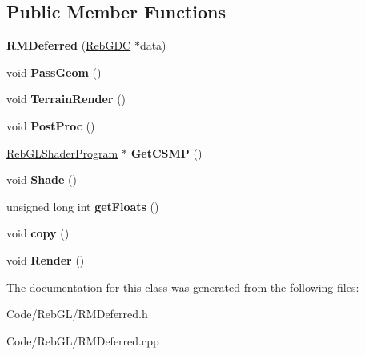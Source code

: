 \subsection*{Public Member Functions}
\begin{DoxyCompactItemize}
\item 
{\bfseries R\+M\+Deferred} (\hyperlink{class_reb_g_d_c}{Reb\+G\+DC} $\ast$data)\hypertarget{class_r_m_deferred_abbf4b490e09042baec769e5b99e96def}{}\label{class_r_m_deferred_abbf4b490e09042baec769e5b99e96def}

\item 
void {\bfseries Pass\+Geom} ()\hypertarget{class_r_m_deferred_a4f677db282954e6221e80b9ff1812abf}{}\label{class_r_m_deferred_a4f677db282954e6221e80b9ff1812abf}

\item 
void {\bfseries Terrain\+Render} ()\hypertarget{class_r_m_deferred_a5a8791bd4821bac19715ec33526816fe}{}\label{class_r_m_deferred_a5a8791bd4821bac19715ec33526816fe}

\item 
void {\bfseries Post\+Proc} ()\hypertarget{class_r_m_deferred_ab242cc10b809d49086f3c84e9cd139ac}{}\label{class_r_m_deferred_ab242cc10b809d49086f3c84e9cd139ac}

\item 
\hyperlink{class_reb_g_l_shader_program}{Reb\+G\+L\+Shader\+Program} $\ast$ {\bfseries Get\+C\+S\+MP} ()\hypertarget{class_r_m_deferred_aa7b56760a9843a52e00d8863d0989f1c}{}\label{class_r_m_deferred_aa7b56760a9843a52e00d8863d0989f1c}

\item 
void {\bfseries Shade} ()\hypertarget{class_r_m_deferred_a3132605e260a61ce0a4baccb10c91704}{}\label{class_r_m_deferred_a3132605e260a61ce0a4baccb10c91704}

\item 
unsigned long int {\bfseries get\+Floats} ()\hypertarget{class_r_m_deferred_a6c7352c848f3f01e9ad88b057ba61342}{}\label{class_r_m_deferred_a6c7352c848f3f01e9ad88b057ba61342}

\item 
void {\bfseries copy} ()\hypertarget{class_r_m_deferred_abac9b80b6bc66dcc2f20ffd5ab32a859}{}\label{class_r_m_deferred_abac9b80b6bc66dcc2f20ffd5ab32a859}

\item 
void {\bfseries Render} ()\hypertarget{class_r_m_deferred_a0b34285239a7ba44d668ef42a6170144}{}\label{class_r_m_deferred_a0b34285239a7ba44d668ef42a6170144}

\end{DoxyCompactItemize}


The documentation for this class was generated from the following files\+:\begin{DoxyCompactItemize}
\item 
Code/\+Reb\+G\+L/R\+M\+Deferred.\+h\item 
Code/\+Reb\+G\+L/R\+M\+Deferred.\+cpp\end{DoxyCompactItemize}
